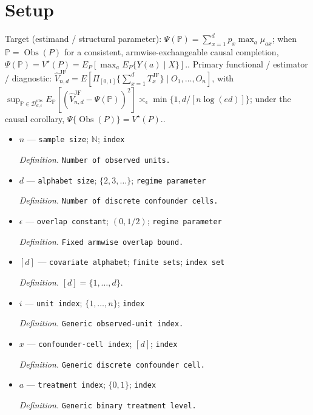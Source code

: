 \documentclass{article}
\begin{document}
\section{Setup}

Target (estimand / structural parameter): \(\Psi(\mathbb P)=\sum_{x=1}^dp_x\max_a\mu_{ax}\); when \(\mathbb P=\operatorname{Obs}(P)\) for a consistent, armwise-exchangeable causal completion, \(\Psi(\mathbb P)=V^\star(P)=E_P[\max_aE_P\{Y(a)\mid X\}]\)..
Primary functional / estimator / diagnostic: \(\widehat V_{n,d}^{\mathrm{JF}}=E[\Pi_{[0,1]}\{\sum_{x=1}^dT_x^{\mathrm{JF}}\}\mid O_1,\ldots,O_n]\), with \(\sup_{\mathbb P\in\mathcal D_{d,\epsilon}^{\mathrm{obs}}}E_{\mathbb P}[(\widehat V_{n,d}^{\mathrm{JF}}-\Psi(\mathbb P))^2]\asymp_\epsilon\min\{1,d/[n\log(ed)]\}\); under the causal corollary, \(\Psi\{\operatorname{Obs}(P)\}=V^\star(P)\)..
\begin{itemize}
  \item \(n\) --- \texttt{sample size}; \(\mathbb N\); \texttt{index}
  \par\smallskip\noindent\emph{Definition.} \texttt{Number of observed units.}
  \item \(d\) --- \texttt{alphabet size}; \(\{2,3,\ldots\}\); \texttt{regime parameter}
  \par\smallskip\noindent\emph{Definition.} \texttt{Number of discrete confounder cells.}
  \item \(\epsilon\) --- \texttt{overlap constant}; \((0,1/2)\); \texttt{regime parameter}
  \par\smallskip\noindent\emph{Definition.} \texttt{Fixed armwise overlap bound.}
  \item \([d]\) --- \texttt{covariate alphabet}; \texttt{finite sets}; \texttt{index set}
  \par\smallskip\noindent\emph{Definition.} \([d]=\{1,\ldots,d\}\).
  \item \(i\) --- \texttt{unit index}; \(\{1,\ldots,n\}\); \texttt{index}
  \par\smallskip\noindent\emph{Definition.} \texttt{Generic observed-\allowbreak{}unit index.}
  \item \(x\) --- \texttt{confounder-\allowbreak{}cell index}; \([d]\); \texttt{index}
  \par\smallskip\noindent\emph{Definition.} \texttt{Generic discrete confounder cell.}
  \item \(a\) --- \texttt{treatment index}; \(\{0,1\}\); \texttt{index}
  \par\smallskip\noindent\emph{Definition.} \texttt{Generic binary treatment level.}

\end{itemize}
\end{document}
